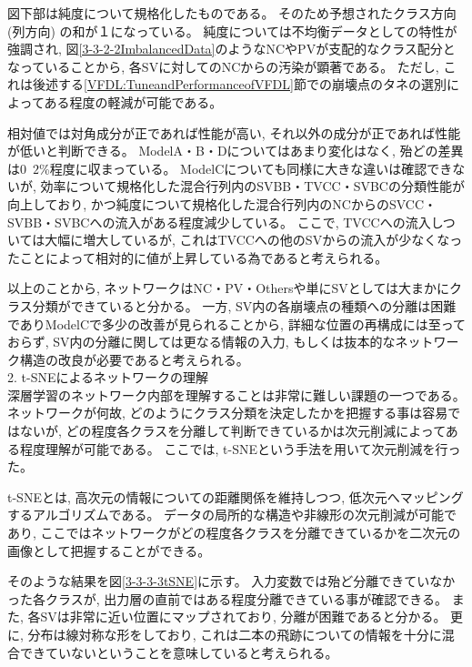 図下部は純度について規格化したものである。
そのため予想されたクラス方向 (列方向) の和が１になっている。
純度については不均衡データとしての特性が強調され, 図\ref{3-3-2-2ImbalancedData}のようなNCやPVが支配的なクラス配分となっていることから, 各SVに対してのNCからの汚染が顕著である。
ただし, これは後述する\ref{VFDL:TuneandPerformanceofVFDL}節での崩壊点のタネの選別によってある程度の軽減が可能である。

相対値では対角成分が正であれば性能が高い, それ以外の成分が正であれば性能が低いと判断できる。
ModelA・B・Dについてはあまり変化はなく, 殆どの差異は$0$~$2$\%程度に収まっている。
ModelCについても同様に大きな違いは確認できないが, 効率について規格化した混合行列内のSVBB・TVCC・SVBCの分類性能が向上しており, かつ純度について規格化した混合行列内のNCからのSVCC・SVBB・SVBCへの流入がある程度減少している。
ここで, TVCCへの流入しついては大幅に増大しているが, これはTVCCへの他のSVからの流入が少なくなったことによって相対的に値が上昇している為であると考えられる。

以上のことから, ネットワークはNC・PV・Othersや単にSVとしては大まかにクラス分類ができていると分かる。
一方, SV内の各崩壊点の種類への分離は困難でありModelCで多少の改善が見られることから, 詳細な位置の再構成には至っておらず, SV内の分離に関しては更なる情報の入力, もしくは抜本的なネットワーク構造の改良が必要であると考えられる。\\

2. t-SNEによるネットワークの理解\\

深層学習のネットワーク内部を理解することは非常に難しい課題の一つである。
ネットワークが何故, どのようにクラス分類を決定したかを把握する事は容易ではないが, どの程度各クラスを分離して判断できているかは次元削減によってある程度理解が可能である。
ここでは, t-SNEという手法を用いて次元削減を行った。

t-SNEとは, 高次元の情報についての距離関係を維持しつつ, 低次元へマッピングするアルゴリズムである。
データの局所的な構造や非線形の次元削減が可能であり, ここではネットワークがどの程度各クラスを分離できているかを二次元の画像として把握することができる。

そのような結果を図\ref{3-3-3-3tSNE}に示す。
入力変数では殆ど分離できていなかった各クラスが, 出力層の直前ではある程度分離できている事が確認できる。
また, 各SVは非常に近い位置にマップされており, 分離が困難であると分かる。
更に, 分布は線対称な形をしており, これは二本の飛跡についての情報を十分に混合できていないということを意味していると考えられる。

